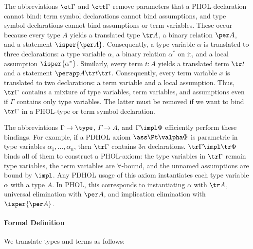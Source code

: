 The abbreviations $\ot\Gamma$ and $\ott\Gamma$ remove parameters that a PHOL-declaration cannot bind: term symbol declarations cannot bind assumptions, and type symbol declarations cannot bind assumptions or term variables.
These occur because every type $A$ yields a translated type $\tr A$, a binary relation $\per A$, and a statement $\isper{\per A}$.
Consequently, a type variable $\alpha$ is translated to three declarations: a type variable $\alpha$, a binary relation $\alpha^*$ on it, and a local assumption $\isper{\alpha^*}$.
Similarly, every term $t:A$ yields a translated term $\tr t$ and a statement $\perapp A {\tr t}{\tr t}$.
Consequently, every term variable $x$ is translated to two declarations: a term variable and a local assumption.
Thus, $\tr\Gamma$ contains a mixture of type variables, term variables, and assumptions even if $\Gamma$ contains only type variables.
The latter must be removed if we want to bind $\tr\Gamma$ in a PHOL-type or term symbol declaration.

The abbreviations $\Gamma\to\type$, $\Gamma\to A$, and $\Gamma\impl \Phi$ efficiently perform these bindings.
For example, if a PDHOL axiom $\ass \Pt\valpha \Phi$ is parametric in type variables $\alpha_1,\ldots,\alpha_n$, then $\tr\Gamma$ contains $3n$ declarations.
$\tr\Gamma \impl \tr \Phi$ binds all of them to construct a PHOL-axiom: the type variables in $\tr\Gamma$ remain type variables, the term variables are $\forall$-bound, and the unnamed assumptions are bound by $\impl$.
Any PDHOL usage of this axiom instantiates each type variable $\alpha$ with a type $A$.
In PHOL, this corresponds to instantiating $\alpha$ with $\tr A$, universal elimination with $\per A$, and implication elimination with $\isper{\per A}$.

\paragraph*{Formal Definition}
We translate types and terms as follows:

